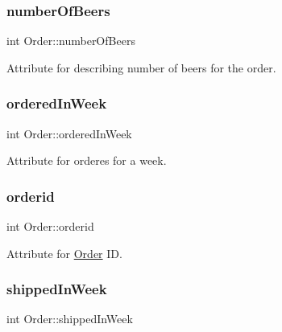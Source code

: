 \subsubsection{\texorpdfstring{number\+Of\+Beers}{numberOfBeers}}
{\footnotesize\ttfamily int Order\+::number\+Of\+Beers\hspace{0.3cm}{\ttfamily [private]}}



Attribute for describing number of beers for the order. 

\mbox{\label{class_order_a5918aa6a6d05f6f4c2f3607094d192d7}} 
\subsubsection{\texorpdfstring{ordered\+In\+Week}{orderedInWeek}}
{\footnotesize\ttfamily int Order\+::ordered\+In\+Week\hspace{0.3cm}{\ttfamily [private]}}



Attribute for orderes for a week. 

\mbox{\label{class_order_a97409bed7105ee7b4cc7304c18badde0}} 
\subsubsection{\texorpdfstring{orderid}{orderid}}
{\footnotesize\ttfamily int Order\+::orderid\hspace{0.3cm}{\ttfamily [private]}}



Attribute for \hyperlink{class_order}{Order} ID. 

\mbox{\label{class_order_ab50c4cb2c20c53d4945fd58dc1e7b395}} 
\subsubsection{\texorpdfstring{shipped\+In\+Week}{shippedInWeek}}
{\footnotesize\ttfamily int Order\+::shipped\+In\+Week\hspace{0.3cm}{\ttfamily [private]}}



